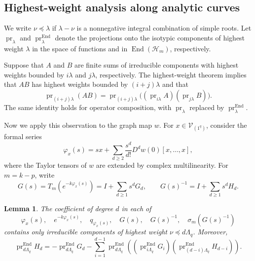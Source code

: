 \documentclass[11pt,reqno]{amsart}
\newtheorem{lemma}[theorem]{Lemma}
\theoremstyle{corollary}
\theoremstyle{conjecture}
\theoremstyle{assumption}
\theoremstyle{proposition}
\theoremstyle{remark}
\numberwithin{equation}{section}
\begin{document}
\subsection{Highest-weight analysis along analytic curves}
\label{subsec:highest-weight-projections}

We write $\nu\preceq\lambda$ if $\lambda-\nu$ is a nonnegative integral combination of simple roots. Let $\operatorname{pr}_\lambda$ and $\operatorname{pr}^{\operatorname{End}}_\lambda$ denote the projections onto the isotypic components of highest weight $\lambda$ in the space of functions and in $\operatorname{End}(\mathcal H_m)$, respectively.

Suppose that $A$ and $B$ are finite sums of irreducible components with highest weights bounded by $i\lambda$ and $j\lambda$, respectively. The highest-weight theorem implies that $AB$ has highest weights bounded by $(i+j)\lambda$ and that
\begin{equation}\label{eq:highest-product-projection}
\operatorname{pr}_{(i+j)\lambda}(AB)=\operatorname{pr}_{(i+j)\lambda}\bigl((\operatorname{pr}_{i\lambda}A)(\operatorname{pr}_{j\lambda}B)\bigr).
\end{equation}
The same identity holds for operator composition, with $\operatorname{pr}_\lambda$ replaced by $\operatorname{pr}^{\operatorname{End}}_\lambda$.


Now we apply this observation to the graph map $w$. For $x\in\mathcal V_{(1^q)}$, consider the formal series
\[
\varphi_x(s)=sx+\sum_{d\geq 2}\frac{s^d}{d!}D^dw(0)[x,\ldots,x],
\]
where the Taylor tensors of $w$ are extended by complex multilinearity. For $m=k-p$, write
\[
G(s)=T_m(e^{-k\varphi_x(s)})=I+\sum_{d\geq 1}s^dG_d,\qquad G(s)^{-1}=I+\sum_{d\geq1}s^dH_d.
\]

\begin{lemma}\label{lem:highest-weight-support}
The coefficient of degree $d$ in each of
\[
\varphi_x(s),\quad e^{-k\varphi_x(s)},\quad q_{\varphi_x(s)},\quad G(s),\quad G(s)^{-1},\quad \sigma_m(G(s)^{-1})
\]
contains only irreducible components of highest weight $\nu\preceq d\Lambda_q$. Moreover,
\begin{equation}\label{eq:projected-inverse-recursion}
\operatorname{pr}^{\operatorname{End}}_{d\Lambda_q}H_d=-\operatorname{pr}^{\operatorname{End}}_{d\Lambda_q}G_d-\sum_{i=1}^{d-1}\operatorname{pr}^{\operatorname{End}}_{d\Lambda_q}\left((\operatorname{pr}^{\operatorname{End}}_{i\Lambda_q}G_i)(\operatorname{pr}^{\operatorname{End}}_{(d-i)\Lambda_q}H_{d-i})\right).
\end{equation}
\end{lemma}
\end{document}
